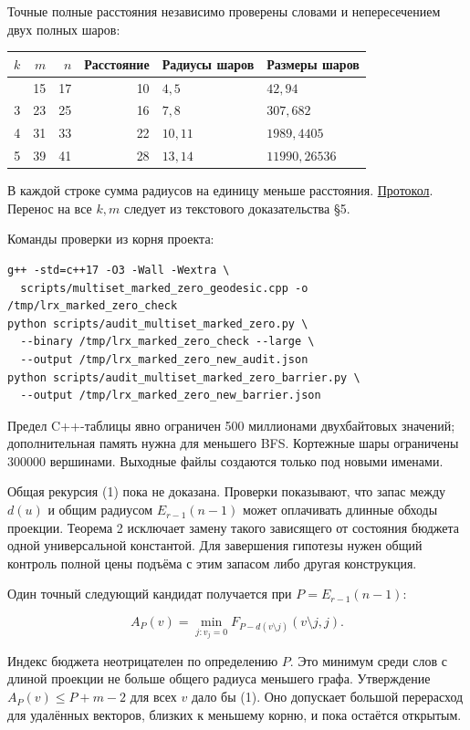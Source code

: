 \documentclass[
  11pt,
  a4paper,
]{article}
\begin{document}
Точные полные расстояния независимо проверены словами и непересечением
двух полных шаров:

\begin{longtable}[]{@{}rrrrll@{}}
\toprule\noalign{}
\(k\) & \(m\) & \(n\) & Расстояние & Радиусы шаров & Размеры шаров \\
\midrule\noalign{}
\endhead
\bottomrule\noalign{}
\endlastfoot
2 & 15 & 17 & 10 & \(4,5\) & \(42,94\) \\
3 & 23 & 25 & 16 & \(7,8\) & \(307,682\) \\
4 & 31 & 33 & 22 & \(10,11\) & \(1989,4405\) \\
5 & 39 & 41 & 28 & \(13,14\) & \(11990,26536\) \\
\end{longtable}

В каждой строке сумма радиусов на единицу меньше расстояния.
\href{literature/multiset_marked_zero_barrier_20260921.json}{Протокол}.
Перенос на все \(k,m\) следует из текстового доказательства §5.

Команды проверки из корня проекта:

\begin{verbatim}
g++ -std=c++17 -O3 -Wall -Wextra \
  scripts/multiset_marked_zero_geodesic.cpp -o /tmp/lrx_marked_zero_check
python scripts/audit_multiset_marked_zero.py \
  --binary /tmp/lrx_marked_zero_check --large \
  --output /tmp/lrx_marked_zero_new_audit.json
python scripts/audit_multiset_marked_zero_barrier.py \
  --output /tmp/lrx_marked_zero_new_barrier.json
\end{verbatim}

Предел C++-таблицы явно ограничен 500 миллионами двухбайтовых значений;
дополнительная память нужна для меньшего BFS. Кортежные шары ограничены
300000 вершинами. Выходные файлы создаются только под новыми именами.

Общая рекурсия (1) пока не доказана. Проверки показывают, что запас
между \(d(u)\) и общим радиусом \(E_{r-1}(n-1)\) может оплачивать
длинные обходы проекции. Теорема 2 исключает замену такого зависящего от
состояния бюджета одной универсальной константой. Для завершения
гипотезы нужен общий контроль полной цены подъёма с этим запасом либо
другая конструкция.

Один точный следующий кандидат получается при \(P=E_{r-1}(n-1)\):

\[A_P(v)=\min_{j:v_j=0}F_{P-d(v\setminus j)}(v\setminus j,j).\]

Индекс бюджета неотрицателен по определению \(P\). Это минимум среди
слов с длиной проекции не больше общего радиуса меньшего графа.
Утверждение \(A_P(v)\le P+m-2\) для всех \(v\) дало бы (1). Оно
допускает большой перерасход для удалённых векторов, близких к меньшему
корню, и пока остаётся открытым.
\end{document}
